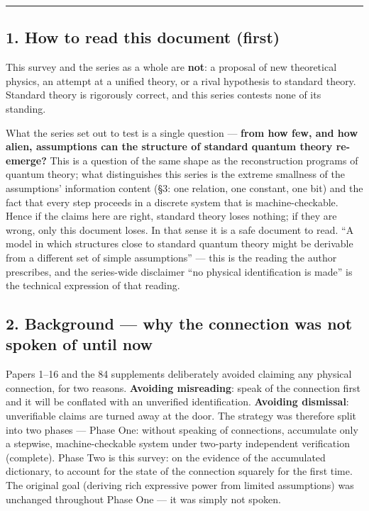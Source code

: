 \documentclass[
]{article}
\newcounter{none} %
\begin{document}
\begin{center}\rule{0.5\linewidth}{0.5pt}\end{center}

\subsection{1. How to read this document
(first)}\label{how-to-read-this-document-first}

This survey and the series as a whole are \textbf{not}: a proposal of
new theoretical physics, an attempt at a unified theory, or a rival
hypothesis to standard theory. Standard theory is rigorously correct,
and this series contests none of its standing.

What the series set out to test is a single question --- \textbf{from
how few, and how alien, assumptions can the structure of standard
quantum theory re-emerge?} This is a question of the same shape as the
reconstruction programs of quantum theory; what distinguishes this
series is the extreme smallness of the assumptions' information content
(§3: one relation, one constant, one bit) and the fact that every step
proceeds in a discrete system that is machine-checkable. Hence if the
claims here are right, standard theory loses nothing; if they are wrong,
only this document loses. In that sense it is a safe document to read.
``A model in which structures close to standard quantum theory might be
derivable from a different set of simple assumptions'' --- this is the
reading the author prescribes, and the series-wide disclaimer ``no
physical identification is made'' is the technical expression of that
reading.

\subsection{2. Background --- why the connection was not spoken of until
now}\label{background-why-the-connection-was-not-spoken-of-until-now}

Papers 1--16 and the 84 supplements deliberately avoided claiming any
physical connection, for two reasons. \textbf{Avoiding misreading}:
speak of the connection first and it will be conflated with an
unverified identification. \textbf{Avoiding dismissal}: unverifiable
claims are turned away at the door. The strategy was therefore split
into two phases --- Phase One: without speaking of connections,
accumulate only a stepwise, machine-checkable system under two-party
independent verification (complete). Phase Two is this survey: on the
evidence of the accumulated dictionary, to account for the state of the
connection squarely for the first time. The original goal (deriving rich
expressive power from limited assumptions) was unchanged throughout
Phase One --- it was simply not spoken.
\end{document}
